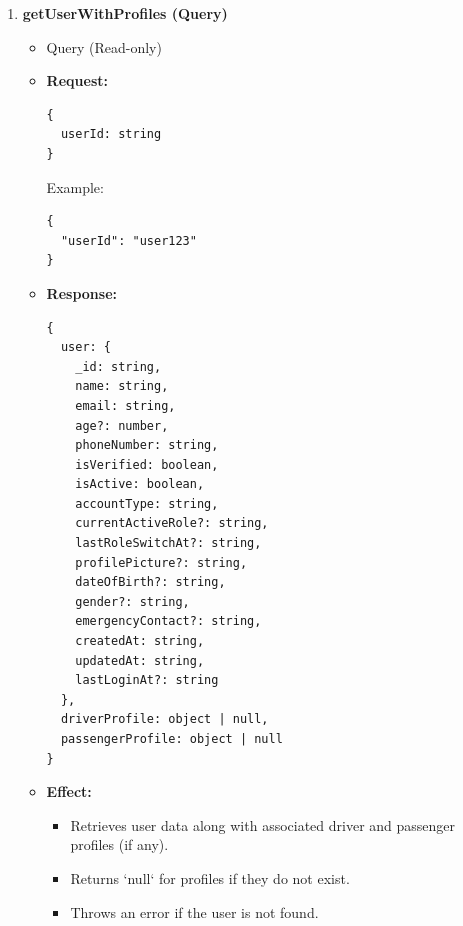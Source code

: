 \documentclass[a4paper,12pt]{article}
\begin{document}
\begin{enumerate}
  \item \textbf{getUserWithProfiles (Query)}
    \begin{itemize}
      \item Query (Read-only)
      \item \textbf{Request:}
      \begin{verbatim}
{
  userId: string
}
      \end{verbatim}
      Example:
      \begin{verbatim}
{
  "userId": "user123"
}
      \end{verbatim}
      \item \textbf{Response:}
      \begin{verbatim}
{
  user: {
    _id: string,
    name: string,
    email: string,
    age?: number,
    phoneNumber: string,
    isVerified: boolean,
    isActive: boolean,
    accountType: string,
    currentActiveRole?: string,
    lastRoleSwitchAt?: string,
    profilePicture?: string,
    dateOfBirth?: string,
    gender?: string,
    emergencyContact?: string,
    createdAt: string,
    updatedAt: string,
    lastLoginAt?: string
  },
  driverProfile: object | null,
  passengerProfile: object | null
}
      \end{verbatim}
      \item \textbf{Effect:}
      \begin{itemize}
        \item Retrieves user data along with associated driver and passenger profiles (if any).
        \item Returns `null` for profiles if they do not exist.
        \item Throws an error if the user is not found.
      \end{itemize}
    \end{itemize}


\end{enumerate}
\end{document}
